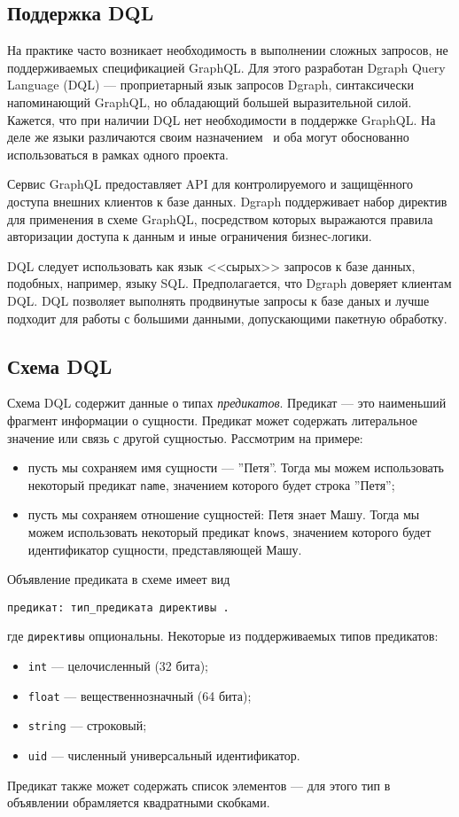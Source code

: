 \subsection{Поддержка DQL}

На практике часто возникает необходимость в выполнении сложных запросов, не поддерживаемых
спецификацией GraphQL. Для этого разработан Dgraph Query Language (DQL) --- проприетарный язык
запросов Dgraph, синтаксически напоминающий GraphQL, но обладающий большей выразительной силой.
Кажется, что при наличии DQL нет необходимости в поддержке GraphQL. На деле же языки различаются
своим назначением~\cite{graphqlVsDql} и оба могут обоснованно использоваться в рамках одного
проекта.

Сервис GraphQL предоставляет API для контролируемого и защищённого доступа внешних клиентов к базе
данных. Dgraph поддерживает набор директив для применения в схеме GraphQL, посредством которых
выражаются правила авторизации доступа к данным и иные ограничения бизнес-логики.

DQL следует использовать как язык <<сырых>> запросов к базе данных, подобных, например, языку SQL. 
Предполагается, что Dgraph доверяет клиентам DQL. DQL позволяет выполнять продвинутые запросы к
базе даных и лучше подходит для работы с большими данными, допускающими пакетную обработку.

\subsection{Схема DQL} \label{dqlSchema}

Схема DQL содержит данные о типах \textit{предикатов}. Предикат --- это наименьший фрагмент
информации о сущности. Предикат может содержать литеральное значение или связь с другой сущностью.
Рассмотрим на примере:
\begin{itemize}
    \item пусть мы сохраняем имя сущности --- ''Петя''. Тогда мы можем использовать некоторый
предикат \texttt{name}, значением которого будет строка ''Петя'';
    \item пусть мы сохраняем отношение сущностей: Петя знает Машу. Тогда мы можем использовать
некоторый предикат \texttt{knows}, значением которого будет идентификатор сущности,
представляющей Машу.
\end{itemize}

Объявление предиката в схеме имеет вид
\begin{Verbatim}
предикат: тип_предиката директивы .
\end{Verbatim}
где \texttt{директивы} опциональны. Некоторые из поддерживаемых типов предикатов:
\begin{itemize}
    \item \texttt{int} --- целочисленный (32 бита);
    \item \texttt{float} --- вещественнозначный (64 бита);
    \item \texttt{string} --- строковый;
    \item \texttt{uid} --- численный универсальный идентификатор.
\end{itemize}
Предикат также может содержать список элементов --- для этого тип в объявлении обрамляется
квадратными скобками.

